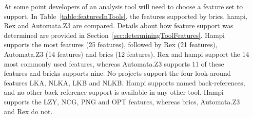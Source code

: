 At some point developers of an analysis tool will need to choose a feature set to support.  In Table~\ref{table:featuresInTools}, the features supported by brics, hampi, Rex and Automata.Z3 are compared.  Details about how feature support was determined are provided in Section~\ref{sec:determiningToolFeatures}.
Hampi supports the most features (25 features), followed by Rex (21 features), Automata.Z3 (14 features) and brics (12 features).  Rex and hampi support the 14 most commonly used features, whereas Automata.Z3 supports 11 of these features and bricks supports nine.  No projects support the four look-around features LKA, NLKA, LKB and NLKB.  Hampi supports named back-references, and no other back-reference support is available in any other tool.  Hampi supports the LZY, NCG, PNG and OPT features, whereas brics, Automata.Z3 and Rex do not.
